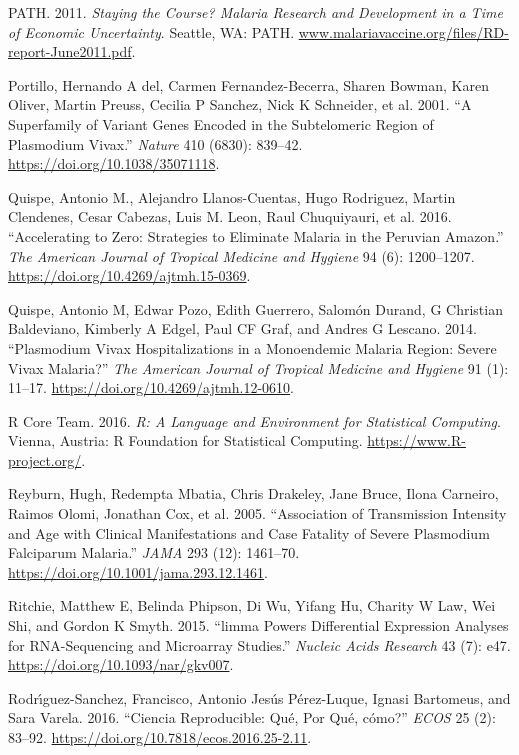 \documentclass[
  a4paper]{article}
\begin{document}
\leavevmode\hypertarget{ref-path2011}{}%
PATH. 2011. \emph{Staying the Course? Malaria Research and Development
in a Time of Economic Uncertainty}. Seattle, WA: PATH.
\url{www.malariavaccine.org/files/RD-report-June2011.pdf}.

\leavevmode\hypertarget{ref-portillo2001vir}{}%
Portillo, Hernando A del, Carmen Fernandez-Becerra, Sharen Bowman, Karen
Oliver, Martin Preuss, Cecilia P Sanchez, Nick K Schneider, et al. 2001.
``A Superfamily of Variant Genes Encoded in the Subtelomeric Region of
Plasmodium Vivax.'' \emph{Nature} 410 (6830): 839--42.
\url{https://doi.org/10.1038/35071118}.

\leavevmode\hypertarget{ref-accelerate2016}{}%
Quispe, Antonio M., Alejandro Llanos-Cuentas, Hugo Rodriguez, Martin
Clendenes, Cesar Cabezas, Luis M. Leon, Raul Chuquiyauri, et al. 2016.
``Accelerating to Zero: Strategies to Eliminate Malaria in the Peruvian
Amazon.'' \emph{The American Journal of Tropical Medicine and Hygiene}
94 (6): 1200--1207. \url{https://doi.org/10.4269/ajtmh.15-0369}.

\leavevmode\hypertarget{ref-quispe2014}{}%
Quispe, Antonio M, Edwar Pozo, Edith Guerrero, Salomón Durand, G
Christian Baldeviano, Kimberly A Edgel, Paul CF Graf, and Andres G
Lescano. 2014. ``Plasmodium Vivax Hospitalizations in a Monoendemic
Malaria Region: Severe Vivax Malaria?'' \emph{The American Journal of
Tropical Medicine and Hygiene} 91 (1): 11--17.
\url{https://doi.org/10.4269/ajtmh.12-0610}.

\leavevmode\hypertarget{ref-R2016}{}%
R Core Team. 2016. \emph{R: A Language and Environment for Statistical
Computing}. Vienna, Austria: R Foundation for Statistical Computing.
\url{https://www.R-project.org/}.

\leavevmode\hypertarget{ref-reyburn2015}{}%
Reyburn, Hugh, Redempta Mbatia, Chris Drakeley, Jane Bruce, Ilona
Carneiro, Raimos Olomi, Jonathan Cox, et al. 2005. ``Association of
Transmission Intensity and Age with Clinical Manifestations and Case
Fatality of Severe Plasmodium Falciparum Malaria.'' \emph{JAMA} 293
(12): 1461--70. \url{https://doi.org/10.1001/jama.293.12.1461}.

\leavevmode\hypertarget{ref-limma}{}%
Ritchie, Matthew E, Belinda Phipson, Di Wu, Yifang Hu, Charity W Law,
Wei Shi, and Gordon K Smyth. 2015. ``limma Powers Differential
Expression Analyses for RNA-Sequencing and Microarray Studies.''
\emph{Nucleic Acids Research} 43 (7): e47.
\url{https://doi.org/10.1093/nar/gkv007}.

\leavevmode\hypertarget{ref-CienciaReproducible2016}{}%
Rodrı́guez-Sanchez, Francisco, Antonio Jesús Pérez-Luque, Ignasi
Bartomeus, and Sara Varela. 2016. ``Ciencia Reproducible: Qué, Por Qué,
cómo?'' \emph{ECOS} 25 (2): 83--92.
\url{https://doi.org/10.7818/ecos.2016.25-2.11}.
\end{document}
